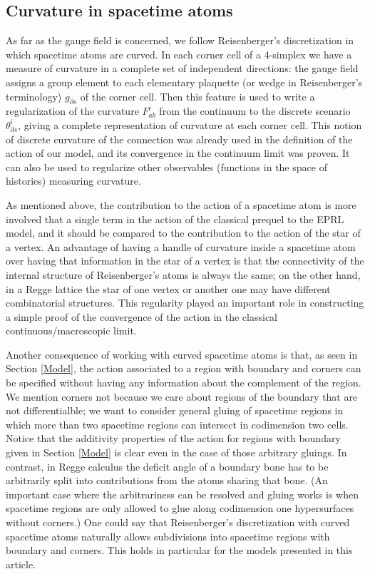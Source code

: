 \documentclass{article}
\begin{document}
\subsection{Curvature in spacetime atoms}

As far as the gauge field is concerned, we follow Reisenberger's discretization \cite{Rei1, Rei2} in which spacetime atoms are curved. 
In each corner cell of a 4-simplex we have a measure of curvature in a complete set of independent directions: the gauge field assigns a group element to each elementary plaquette (or wedge in Reisenberger's terminology) $g_{\partial s}$ of the corner cell. 
Then this feature is used to write a regularization of the curvature $F_{ab}^i$ from the continuum to the discrete scenario $\theta_{\partial s}^i$, giving a complete representation of curvature at each corner cell. 
This notion of discrete curvature of the connection was already used in the definition of the action of our model, and its convergence in the continuum limit was proven. It can also be used to regularize other observables (functions in the space of histories) measuring curvature. 

As mentioned above, the contribution to the action of a spacetime atom is more involved that a single term in the action of the classical prequel to the EPRL model, and it should be compared to the contribution to the action of the star of a vertex. 
An advantage of having a handle of curvature inside a spacetime atom over having that information in the star of a vertex is that the connectivity of the internal structure of Reisenberger's atoms is always the same; on the other hand, in a Regge lattice the star of one vertex or another one may have different combinatorial structures. This regularity played an important role in constructing a simple proof of the convergence of the action in the classical continuous/macroscopic limit. 

Another consequence of working with curved spacetime atoms is that, as seen in Section \ref{Model}, the action associated to a region with boundary and corners can be specified without having any information about the complement of the region. 
We mention corners not because we care about regions of the boundary that are not differentialble; we want to consider general gluing of spacetime regions in which more than two spacetime regions can intersect in codimension two cells. 
Notice that the additivity properties of the action for regions with boundary given in Section \ref{Model} is clear even in the case of those arbitrary gluings. 
In contrast, in Regge calculus the deficit angle of a boundary bone has to be arbitrarily split into contributions from the atoms sharing that bone. (An important case where the arbitrariness can be resolved and gluing works \cite{Hartle+Sorkin} is when spacetime regions are only allowed to glue along codimension one hypersurfaces without corners.) 
One could say that Reisenberger's discretization with curved spacetime atoms naturally allows subdivisions into spacetime regions with boundary and corners. This holds in particular for the models presented in this article. 
\end{document}
